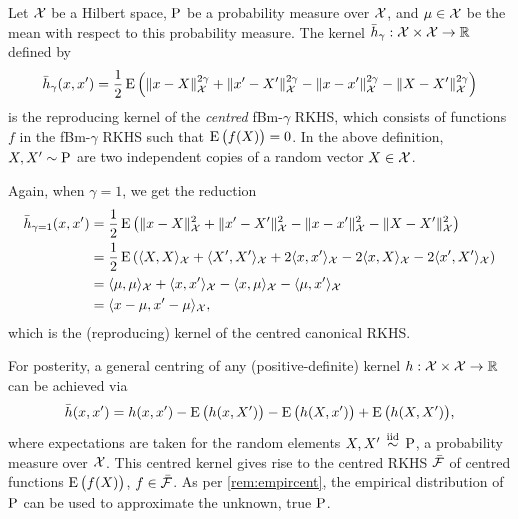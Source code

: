 \begin{definition}
  Let ${\mathcal X}$ be a Hilbert space, $\operatorname{P}$ be a probability measure over ${\mathcal X}$, and $\mu\in{\mathcal X}$ be the mean 
  with respect to this probability measure.
  The kernel $\bar h_\gamma:{\mathcal X}\times{\mathcal X}\to\mathbb{R}$ defined by
  \[
    \bar h_\gamma(x,x') = \frac{1}{2} \operatorname{E} \left( \lVert x-X\rVert_{\mathcal X}^{2\gamma} + \lVert x'-X'\rVert_{\mathcal X}^{2\gamma} - \lVert x-x'\rVert_{\mathcal X}^{2\gamma} - \lVert X-X'\rVert_{\mathcal X}^{2\gamma} \right)
  \]
  is the reproducing kernel of the \emph{centred} fBm-$\gamma$ RKHS, which consists of functions $f$ in the fBm-$\gamma$ RKHS such that $\operatorname{E} \big( f(X) \big) = 0$.
  In the above definition, $X,X' \sim \operatorname{P}$ are two independent copies of a random vector $X \in {\mathcal X}$.
\end{definition}

\begin{remark}
  Again, when $\gamma=1$, we get the reduction 
  \vspace{-0.1em}
  \begin{align*}
    \bar h_{\gamma=1}(x,x') 
    &= \half \E \left( \norm{x-X}_\cX^{2} + \norm{x'-X'}_\cX^{2} - \norm{x-x'}_\cX^{2} - \norm{X-X'}_\cX^{2} \right) \\
    &= \half \E \left( \ip{X,X}_\cX + \ip{X',X'}_\cX + 2\ip{x,x'}_\cX - 2\ip{x,X}_\cX - 2\ip{x',X'}_\cX\right) \\
    &= \ip{\mu,\mu}_\cX + \ip{x,x'}_\cX - \ip{x,\mu}_\cX - \ip{\mu,x'}_\cX \\
    &= \ip{x-\mu,x'-\mu}_\cX, \vspace{-1em}
  \end{align*}
  which is the (reproducing) kernel of the centred canonical RKHS.
\end{remark}

\begin{remark}
  For posterity, a general centring of any (positive-definite) kernel $h:{\mathcal X}\times{\mathcal X}\to\mathbb{R}$ can be achieved via
  \[
    \bar h(x,x') = h(x,x') - \operatorname{E}\big(h(x,X')\big) - \operatorname{E}\big(h(X,x')\big) + \operatorname{E}\big(h(X,X')\big),
  \]  
  where expectations are taken for the random elements $X,X'\,\overset{\text{iid}}{\sim}\,\operatorname{P}$, a probability measure over ${\mathcal X}$.
  This centred kernel gives rise to the centred RKHS $\bar{{\mathcal F}}$ of centred functions $\operatorname{E}\big(f(X)\big)$, $f\in\bar{{\mathcal F}}$.
  As per \cref{rem:empircent}, the empirical distribution of $\operatorname{P}$ can be used to approximate the unknown, true $\operatorname{P}$.
\end{remark}

